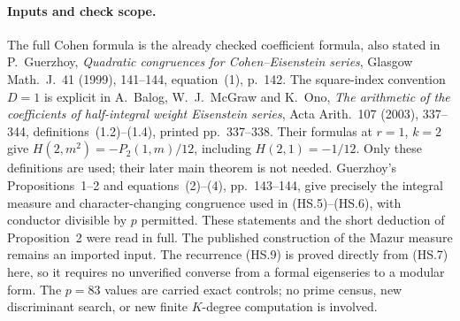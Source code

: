 \paragraph{Inputs and check scope.}
The full Cohen formula is the already checked coefficient
formula, also stated in P.~Guerzhoy,
\emph{Quadratic congruences for Cohen--Eisenstein series},
Glasgow Math.~J.~41 (1999), 141--144, equation~(1), p.~142.
The square-index convention $D=1$ is explicit in
A.~Balog, W.~J.~McGraw and K.~Ono,
\emph{The arithmetic of the coefficients of half-integral weight
Eisenstein series}, Acta Arith.~107 (2003), 337--344,
definitions~(1.2)--(1.4), printed pp.~337--338.
Their formulas at $r=1$, $k=2$ give
$H(2,m^2)=-P_2(1,m)/12$, including $H(2,1)=-1/12$.
Only these definitions are used; their later main theorem
is not needed.
Guerzhoy's Propositions~1--2 and equations~(2)--(4), pp.~143--144,
give precisely the integral measure and character-changing
congruence used in (HS.5)--(HS.6), with conductor divisible
by $p$ permitted.
These statements and the short deduction of Proposition~2 were
read in full.  The published construction of the Mazur measure
remains an imported input.
The recurrence (HS.9) is proved directly from (HS.7) here,
so it requires no unverified converse from a formal eigenseries
to a modular form.
The $p=83$ values are carried exact controls; no prime census,
new discriminant search, or new finite $K$-degree computation
is involved.
